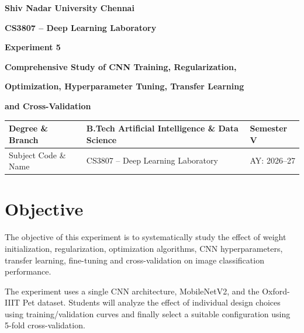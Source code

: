 \documentclass[10pt]{article}
\begin{document}

\begin{center}

{\large\textbf{Shiv Nadar University Chennai}}

\vspace{2mm}

{\normalsize\textbf{CS3807 -- Deep Learning Laboratory}}

\vspace{2mm}

{\large\textbf{Experiment 5}}

\vspace{1mm}

{\normalsize\textbf{Comprehensive Study of CNN Training, Regularization,}}

{\normalsize\textbf{Optimization, Hyperparameter Tuning, Transfer Learning}}

{\normalsize\textbf{and Cross-Validation}}

\end{center}

\vspace{3mm}

\begin{tabular}{|p{3.4cm}|p{9.0cm}|p{1.4cm}|}
\hline
Degree \& Branch &
B.Tech Artificial Intelligence \& Data Science &
Semester V\\
\hline
Subject Code \& Name &
CS3807 -- Deep Learning Laboratory &
AY: 2026--27\\
\hline
\end{tabular}

\section{Objective}

The objective of this experiment is to systematically study the effect of
weight initialization, regularization, optimization algorithms, CNN
hyperparameters, transfer learning, fine-tuning and cross-validation on
image classification performance.

The experiment uses a single CNN architecture, MobileNetV2, and the
Oxford-IIIT Pet dataset. Students will analyze the effect of individual
design choices using training/validation curves and finally select a
suitable configuration using 5-fold cross-validation.
\end{document}
